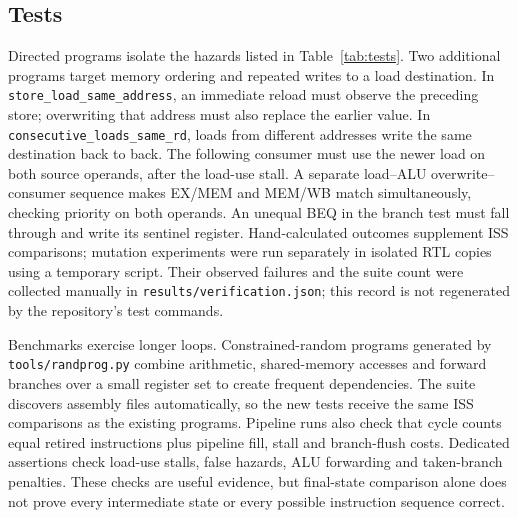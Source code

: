 \subsection{Tests}
Directed programs isolate the hazards listed in Table~\ref{tab:tests}.
Two additional programs target memory ordering and repeated writes to a
load destination. In \texttt{store\_\allowbreak{}load\_\allowbreak{}same\_\allowbreak{}address}, an immediate
reload must observe the preceding store; overwriting that address must
also replace the earlier value. In \texttt{consecutive\_\allowbreak{}loads\_\allowbreak{}same\_\allowbreak{}rd},
loads from different addresses write the same destination back to back.
The following consumer must use the newer load on both source operands,
after the load-use stall. A separate load--ALU overwrite--consumer
sequence makes EX/MEM and MEM/WB match simultaneously, checking priority
on both operands. An unequal BEQ in the branch test must fall through and
write its sentinel register. Hand-calculated outcomes supplement ISS comparisons;
mutation experiments were run separately in isolated RTL copies using a
temporary script. Their observed failures and the suite count were collected
manually in \texttt{results/verification.json}; this record is not regenerated
by the repository's test commands.

Benchmarks exercise longer loops. Constrained-random programs generated by
\texttt{tools/randprog.py} combine arithmetic, shared-memory accesses and
forward branches over a small register set to create frequent dependencies.
The suite discovers assembly files automatically, so the new tests receive
the same ISS comparisons as the existing programs. Pipeline runs also check
that cycle counts equal retired instructions plus pipeline fill, stall and
branch-flush costs. Dedicated assertions check load-use stalls, false
hazards, ALU forwarding and taken-branch penalties. These checks are useful
evidence, but final-state comparison alone does not prove every intermediate
state or every possible instruction sequence correct.

